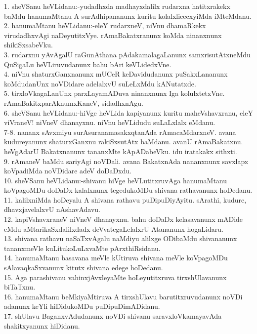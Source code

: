 \documentclass{article}
\begin{document}
1. sheVSanu heVLidanu:-yudadhxda madhayxdalilx rudarxna hatitxrakekx baMdu hanumaMtanu A surAdhipananunx kuritu kolalxlicecxyiMda iMteMdanu.\\
2. hanumaMtanu heVLidanu:-eleY rudarxneV, niVnu dhamaRkekx virudadhxvAgi naDeyutitxVye. rAmaBakatxranunx koMda ninanxnunx shikiSxsabeVku.\\
3. rudarxnu yAvAgalU raGunAthana pAdakamalagaLanunx samxrisutAtxneMdu QuSigaLu heVLiruvudanunx bahu bAri keVLidedxVne.\\
4. niVnu shaturxGanxnanunx mUCeR keDavidudanunx puSakxLananunx koMdudanUnx noVDidare adelalxvU suLeLxMdu kANutatxde.\\
5. tirxloVkagaLanUnx parxLayamADuva ninanxnunx Iga kolulxtetxVne. rAmaBakitxparAknumxKaneV, sidadhxnAgu.\\
6. sheVSanu heVLidanu:-hiVge heVLida kapiyanunx kuritu maheVshavxranu, eleY viVraneV! niVneV dhanayxnu. niVnu heVLidudu suLaLxlalx eMdanu.\\
7-8. nananx sAvxmiyu surAsuranamasakxqtanAda rAmacaMdarxneV. avana kudureyanunx shaturxGanxnu rakiSxsutAtx baMdanu. avanU rAmaBakatxnu. heVgAdarU Bakatxnanunx tananxMte kApADabeVku. idu iratakakx sithxti.\\
9. rAmaneV baMdu sariyAgi noVDali. avana BakatxnAda nananxnunx savxlapx koVpadiMda noVDidare adeV doDaDxdu.\\
10. sheVSanu heVLidanu:-shivanu hiVge heVLutitxruvAga hanumaMtanu koVpagoMDu doDaDx kalalxnunx tegedukoMDu shivana rathavanunx hoDedanu.\\
11. kalilxniMda hoDeyalu A shivana rathavu puDipuDiyAyitu. sArathi, kudure, dhavxjavelalxvU nAshavAdavu.\\
12. kapiVshavxraneV niVneV dhanayxnu. bahu doDaDx kelasavanunx mADide eMdu aMtarikaSxdalilxdadx deVvategaLelalxrU Atananunx hogaLidaru.\\
13. shivana rathavu naSaTxvAgalu naMdiyu alilxge ODibaMdu shivananunx tananxmeVle kuLitukoLuLxvaMte pArxthiRsidanu.\\
14. hanumaMtanu basavana meVle kUtiruva shivana meVle koVpagoMDu sAlavaqkaSxvanunx kitutx shivana edege hoDedanu.\\
15. Aga parashivanu vahinxjAvxleyaMte hoLeyutitxruva tirxshUlavanunx biTaTxnu.\\
16. hanumaMtanu beMkiyaMtiruva A tirxshUlavu barutitxruvudanunx noVDi adanunx keYli hiDidukoMDu puDipuDimADidanu.\\
17. shUlavu BaganxvAdudanunx noVDi shivanu saravxloVkamayavAda shakitxyanunx hiDidanu.\\
\end{document}
